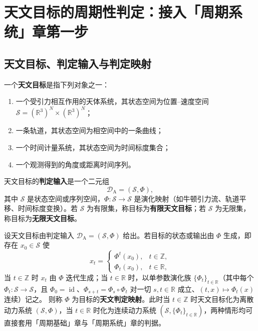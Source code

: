 \section{天文目标的周期性判定：接入「周期系统」章第一步}
\label{sec:astro_periodicity_decision}

\subsection{天文目标、判定输入与判定映射}

\begin{definition}[天文目标与判定输入]\label{def:astro_target}
一个\textbf{天文目标}是指下列对象之一：
\begin{enumerate}[label=(\roman*)]
    \item 一个受引力相互作用的天体系统，其状态空间为位置--速度空间 \(\mathcal S=(\mathbb R^3)^N\times(\mathbb R^3)^N\)；
    \item 一条轨道，其状态空间为相空间中的一条曲线；
    \item 一个时间计量系统，其状态空间为时间标度集合；
    \item 一个观测得到的角度或距离时间序列。
\end{enumerate}
天文目标的\textbf{判定输入}是一个二元组
\[
\mathcal D_{\mathrm{A}}=(\mathcal S,\Phi),
\]
其中 \(\mathcal S\) 是状态空间或序列空间，\(\Phi:\mathcal S\to\mathcal S\) 是演化映射（如牛顿引力流、轨道平移、时间标度变换）。若 \(\mathcal S\) 为有限集，称目标为\textbf{有限天文目标}；若 \(\mathcal S\) 为无限集，称目标为\textbf{无限天文目标}。
\end{definition}

\begin{definition}[天文判定映射]\label{def:astro_periodization}
设天文目标由判定输入 \(\mathcal D_{\mathrm{A}}=(\mathcal S,\Phi)\) 给出。若目标的状态或输出由 \(\Phi\) 生成，即存在 \(x_0\in\mathcal S\) 使
\[
x_t=\begin{cases}\Phi^t(x_0), & t\in\mathbb Z,\\ \Phi_t(x_0), & t\in\mathbb R,\end{cases}
\]
当 \(t\in\mathbb Z\) 时 \(x_t\) 由 \(\Phi\) 迭代生成；当 \(t\in\mathbb R\) 时，以单参数演化族 \(\{\Phi_t\}_{t\in\mathbb R}\)（其中每个 \(\Phi_t:\mathcal S\to\mathcal S\)，且 \(\Phi_0=\operatorname{id}\)、\(\Phi_{s+t}=\Phi_s\circ\Phi_t\) 对一切 \(s,t\in\mathbb R\) 成立、\((t,x)\mapsto\Phi_t(x)\) 连续）记之。
则称 \(\Phi\) 为目标的\textbf{天文判定映射}。此时当 \(t\in\mathbb Z\) 时天文目标化为离散动力系统 \((\mathcal S,\Phi)\)，当 \(t\in\mathbb R\) 时化为连续动力系统 \((\mathcal S,\{\Phi_t\}_{t\in\mathbb R})\)，两种情形均可直接套用「周期基础」章与「周期系统」章的判据。
\end{definition}

